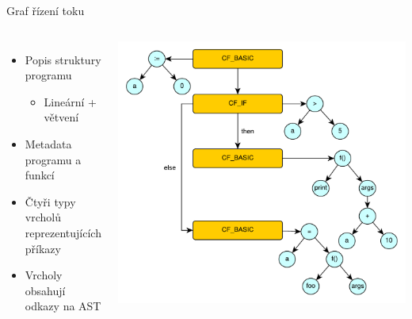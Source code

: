 \documentclass[10pt,xcolor=pdflatex,hyperref={unicode,hidelinks}]{beamer}
\begin{document}
\begin{frame}{Graf řízení toku}
\begin{columns}[T]
        \begin{itemize}
            \item Popis struktury programu
            \begin{itemize}
                \item Lineární + větvení
            \end{itemize}
            \item Metadata programu a funkcí
            \item Čtyři typy vrcholů reprezentujících příkazy
            \item Vrcholy obsahují odkazy na AST
        \end{itemize}
        
        \lstset{xleftmargin=1cm,basicstyle=\small}
        
        
        \centering
        \includegraphics[width=\columnwidth]{img/cfg_ast.pdf}
\end{columns}
    
\end{frame}
\end{document}
